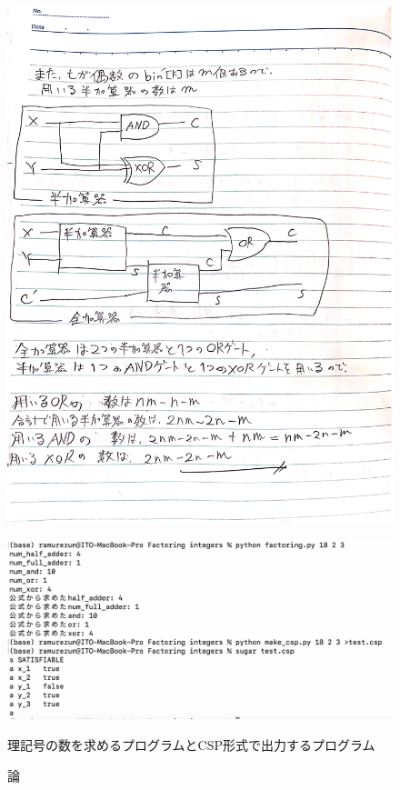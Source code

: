 \documentclass[dvipdfmx,a4paper,12pt]{jsarticle}
\begin{document}
\begin{figure}[htbp]
  \centering
  \includegraphics[width=130mm]{images/IMG_7425.JPG}
\end{figure}


\begin{figure}[htbp]
  \centering
  \includegraphics[width=130mm]{images/pro.png}
  \caption 論理記号の数を求めるプログラムとCSP形式で出力するプログラム
\end{figure}

 
\end{document}
